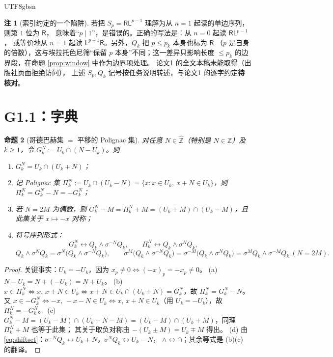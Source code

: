 \documentclass[11pt,a4paper]{article}
\newcommand{\Zhat}{\widehat{\mathbb Z}}
\newcommand{\Lsym}{\ensuremath{\mathsf{L}}}
\newcommand{\Rsym}{\ensuremath{\mathsf{R}}}
\newcommand{\status}[1]{\par\noindent\fbox{\textbf{状态：#1}}\par\smallskip}
\theoremstyle{plain}
\newtheorem{prop}{命题}[section]
\theoremstyle{definition}
\newtheorem{rem}[prop]{注}
\begin{document}
\begin{CJK}{UTF8}{gbsn}
\begin{rem}[索引约定的一个陷阱]\label{rem:index}
若把 $S_p=\Rsym\Lsym^{p-1}$ 理解为从 $n=1$ 起读的单边序列，则第 $1$ 位为 $\Rsym$，
意味着“$p\mid 1$”，是错误的。正确的写法是：从 $n=0$ 起读 $\Rsym\Lsym^{p-1}$，
或等价地从 $n=1$ 起读 $\Lsym^{p-1}\Rsym$。另外，$Q_k$ 把 $p\le p_k$ 本身也标为 $\Rsym$
（$p$ 是自身的倍数），这与埃拉托色尼筛“保留 $p$ 本身”不同；这一差异只影响长度
$\le p_k$ 的边界段，在命题 \ref{prop:window} 中作为边界项处理。
论文1 \cite{Wang26} 的全文本稿未能取得（出版社页面拒绝访问），
上述 $S_p,Q_k$ 记号按任务说明转述，与论文1 的逐字约定\textbf{待核对}。
\end{rem}

\section{G1.1：字典}\label{sec:dict}

\begin{prop}[哥德巴赫集 $=$ 平移的 Polignac 集]\label{prop:dict}
对任意 $N\in\Zhat$（特别是 $N\in\mathbb Z$）及 $k\ge1$，令
$G_k^N:=U_k\cap(N-U_k)$。则
\begin{enumerate}[label=(\alph*)]
\item $G_k^N=U_k\cap(U_k+N)$；
\item 记 Polignac 集 $\Pi_k^N:=U_k\cap(U_k-N)=\{x: x\in U_k,\ x+N\in U_k\}$，则
$\Pi_k^N=G_k^N-N=-G_k^N$；
\item 若 $N=2M$ 为偶数，则 $G_k^N-M=\Pi_k^N+M=(U_k+M)\cap(U_k-M)$，且此集关于 $x\mapsto-x$ 对称；
\item 符号序列形式：
\[
G_k^N\longleftrightarrow Q_k\wedge\sigma^{-N}Q_k,\qquad
\Pi_k^N\longleftrightarrow Q_k\wedge\sigma^{N}Q_k,
\]
\[
Q_k\wedge\sigma^{N}Q_k=\sigma^{N}\bigl(Q_k\wedge\sigma^{-N}Q_k\bigr),\qquad
\sigma^{M}\bigl(Q_k\wedge\sigma^{-N}Q_k\bigr)=\sigma^{-M}\bigl(Q_k\wedge\sigma^{N}Q_k\bigr)=\sigma^{M}Q_k\wedge\sigma^{-M}Q_k\ (N=2M).
\]
\end{enumerate}
\end{prop}
\status{已证}
\begin{proof}
关键事实：$U_k=-U_k$，因为 $x_p\neq0\iff(-x)_p=-x_p\neq0$。
(a) $N-U_k=N+(-U_k)=N+U_k$。
(b) $x\in\Pi_k^N\iff x,\,x+N\in U_k\iff x+N\in U_k\cap(U_k+N)=G_k^N$，故 $\Pi_k^N=G_k^N-N$。
又 $x\in -G_k^N\iff -x,\,-x-N\in U_k\iff x,\,x+N\in U_k$（用 $U_k=-U_k$），故 $\Pi_k^N=-G_k^N$。
(c) $G_k^N-M=(U_k-M)\cap(U_k+N-M)=(U_k-M)\cap(U_k+M)$，同理 $\Pi_k^N+M$ 也等于此集；
其关于取负对称由 $-(U_k\pm M)=U_k\mp M$ 得出。
(d) 由 \eqref{eq:shiftset}：$\sigma^{-N}Q_k\leftrightarrow U_k+N$，$\sigma^{N}Q_k\leftrightarrow U_k-N$，
$\wedge\leftrightarrow\cap$；其余等式是 (b)(c) 的翻译。
\end{proof}


\end{CJK}
\end{document}
